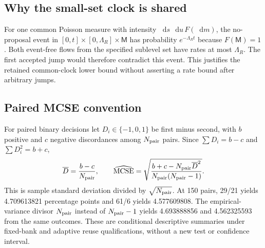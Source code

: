 \documentclass[11pt,a4paper]{article}
\newcommand{\dif}{\mathop{}\!\mathrm{d}}
\begin{document}
\subsection{Why the small-set clock is shared}
For one common Poisson measure with intensity
$\dif s\,\dif u\,F(\dif m)$, the no-proposal event in
$[0,t]\times[0,\Lambda_R]\times\mathsf M$ has probability
$e^{-\Lambda_Rt}$ because $F(\mathsf M)=1$. Both event-free flows from the
specified sublevel set have rates at most $\Lambda_R$. The first accepted
jump would therefore contradict this event. This justifies the retained
common-clock lower bound without asserting a rate bound after arbitrary
jumps.

\subsection{Paired MCSE convention}
For paired binary decisions let $D_i\in\{-1,0,1\}$ be first minus second,
with $b$ positive and $c$ negative discordances among $N_{\rm pair}$ pairs.
Since $\sum D_i=b-c$ and $\sum D_i^2=b+c$,
\[
\overline D=\frac{b-c}{N_{\rm pair}},\qquad
\widehat{\operatorname{MCSE}}=
\sqrt{\frac{b+c-N_{\rm pair}\overline D^2}{N_{\rm pair}(N_{\rm pair}-1)}}.
\]
This is sample standard deviation divided by $\sqrt{N_{\rm pair}}$.
At 150 pairs, 29/21 yields 4.709613821 percentage points and 61/6 yields
4.577609808. The empirical-variance divisor $N_{\rm pair}$ instead of
$N_{\rm pair}-1$ yields 4.693888856 and 4.562325593 from the same outcomes.
These are conditional descriptive summaries under fixed-bank and adaptive
reuse qualifications, without a new test or confidence interval.
\end{document}
